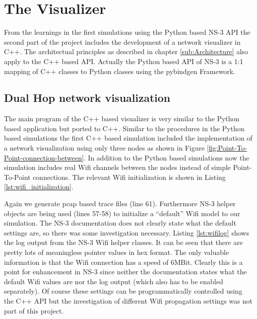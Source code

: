 
\section{The Visualizer}

From the learnings in the first simulations using the Python based
NS-3 API the second part of the project includes the development of
a network visualizer in C++. The architectual principles as described
in chapter \ref{sub:Architecture} also apply to the C++ based API.
Actually the Python based API of NS-3 is a 1:1 mapping of C++ classes
to Python classes using the pybindgen Framework.


\subsection{Dual Hop network visualization}

The main program of the C++ based visualizer is very similar to the
Python based application but ported to C++. Similar to the procedures
in the Python based simulations the first C++ based simulation included
the implementation of a network visualization using only three nodes
as shown in Figure \ref{fig:Point-To-Point-connection-between}. In
addition to the Python based simulations now the simulation includes
real Wifi channels between the nodes instead of simple Point-To-Point
connections. The relevant Wifi initialization is shown in Listing
\ref{lst:wifi_initialization}.

\texttt{\small }{\small \par}

Again we generate pcap based trace files (line 61). Furthermore NS-3
helper objects are being used (lines 57-58) to initialize a {}``default''
Wifi model to our simulation. The NS-3 documentation does not clearly
state what the default settings are, so there was some investigation
necessary. Listing \ref{lst:wifilog} shows the log output from the
NS-3 Wifi helper classes. It can be seen that there are pretty lots
of meaningless pointer values in hex format. The only valuable information
is that the Wifi connection has a speed of 6MBit. Clearly this is
a point for enhancement in NS-3 since neither the documentation states
what the default Wifi values are nor the log output (which also has
to be enabled separately). Of course these settings can be programmatically
controlled using the C++ API but the investigation of different Wifi
propagation settings was not part of this project.

